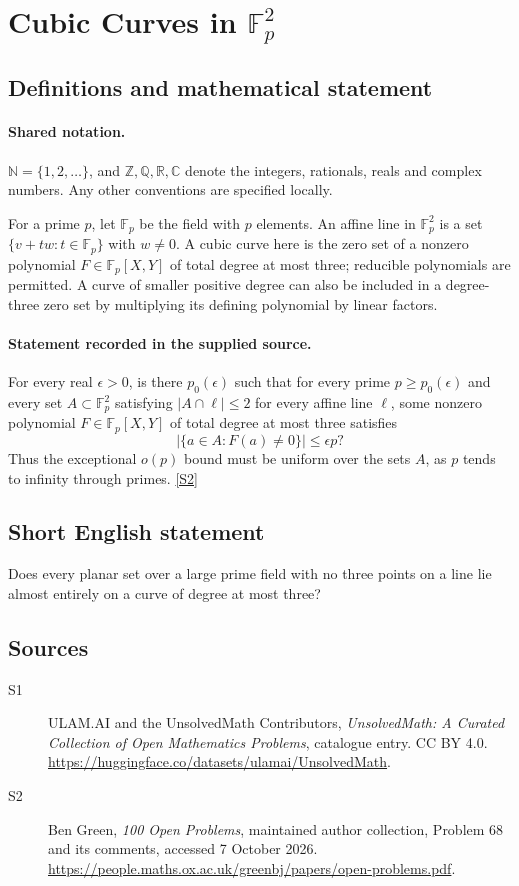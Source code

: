 \documentclass[11pt]{article}
\newcommand{\sref}[2]{\hyperlink{source:#1:#2}{[S#2]}}
\begin{document}
\section{Cubic Curves in $\mathbb F_p^2$}\label{statement}

\subsection{Definitions and mathematical statement}

\paragraph{Shared notation.}$\mathbb N=\{1,2,\ldots\}$, and $\mathbb Z,\mathbb Q,\mathbb R,\mathbb C$ denote the integers, rationals, reals and complex numbers. Any other conventions are specified locally.


For a prime $p$, let $\mathbb F_p$ be the field with $p$ elements. An affine line in $\mathbb F_p^2$ is a set $\{v+t w:t\in\mathbb F_p\}$ with $w\ne0$. A cubic curve here is the zero set of a nonzero polynomial $F\in\mathbb F_p[X,Y]$ of total degree at most three; reducible polynomials are permitted. A curve of smaller positive degree can also be included in a degree-three zero set by multiplying its defining polynomial by linear factors.
\paragraph{Statement recorded in the supplied source.}
For every real $\epsilon>0$, is there $p_0(\epsilon)$ such that for every prime $p\geq p_0(\epsilon)$ and every set $A\subset\mathbb F_p^2$ satisfying $|A\cap\ell|\leq2$ for every affine line $\ell$, some nonzero polynomial $F\in\mathbb F_p[X,Y]$ of total degree at most three satisfies
\[
 |\{a\in A:F(a)\ne0\}|\leq\epsilon p?
\]
Thus the exceptional $o(p)$ bound must be uniform over the sets $A$, as $p$ tends to infinity through primes. \sref{statement}{2}
\subsection{Short English statement}
Does every planar set over a large prime field with no three points on a line lie almost entirely on a curve of degree at most three?
\subsection{Sources}
\begin{description}
\item[\hypertarget{source:statement:1}{S1}] ULAM.AI and the UnsolvedMath Contributors, \emph{UnsolvedMath: A Curated Collection of Open Mathematics Problems}, catalogue entry. CC BY 4.0. \url{https://huggingface.co/datasets/ulamai/UnsolvedMath}.
\item[\hypertarget{source:statement:2}{S2}] Ben Green, \emph{100 Open Problems}, maintained author collection, Problem 68 and its comments, accessed 7 October 2026. \url{https://people.maths.ox.ac.uk/greenbj/papers/open-problems.pdf}.
\end{description}
\label{end:statement}
\end{document}
